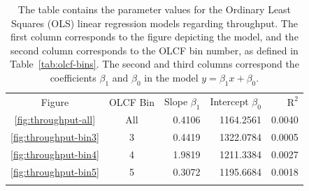 \begin{table}
\caption{The table contains the parameter values for the Ordinary Least Squares
(OLS) linear regression models regarding throughput. The first column
corresponds to the figure depicting the model, and the second column
corresponds to the OLCF bin number, as defined in Table~\ref{tab:olcf-bins}.
The second and third columns correspond the coefficients $\beta_1$ and
$\beta_0$ in the model $y = \beta_{1}x + \beta_0$.}
\label{tab:throughput-params}       %
\begin{tabular}{ccrrr}
\hline\noalign{\smallskip}
Figure & OLCF Bin & Slope $\beta_1$  & Intercept $\beta_0$  &   $\text{R}^2$ \\
\noalign{\smallskip}\hline\noalign{\smallskip}
\ref{fig:throughput-all}    &   All &   0.4106  &   1164.2561   & 0.0040    \\
\ref{fig:throughput-bin3}   &   3   &   0.4419  &   1322.0784   & 0.0005    \\
\ref{fig:throughput-bin4}   &   4   &   1.9819  &   1211.3384   & 0.0027    \\
\ref{fig:throughput-bin5}   &   5   &   0.3072  &   1195.6684   & 0.0018    \\
\noalign{\smallskip}\hline
\end{tabular}
\end{table}

